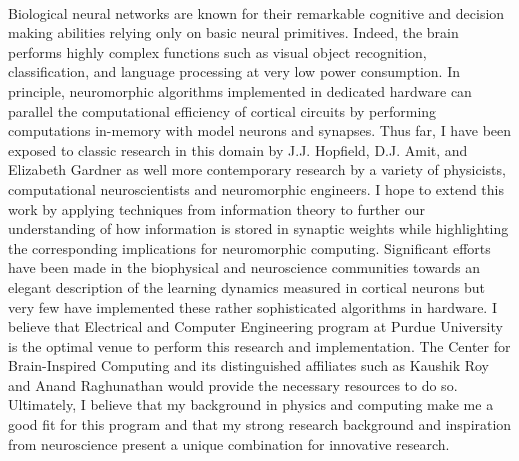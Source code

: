 \documentclass{article}
\begin{document}
\\
\indent Biological neural networks are known for their remarkable cognitive and decision making abilities relying only on basic neural primitives. Indeed, the brain performs highly complex functions such as visual object recognition, classification, and language processing at very low power consumption. In principle, neuromorphic algorithms implemented in dedicated hardware can parallel the computational efficiency of cortical circuits by performing computations in-memory with model neurons and synapses. Thus far, I have been exposed to classic research in this domain by J.J. Hopfield, D.J. Amit, and Elizabeth Gardner as well more contemporary research by a variety of physicists, computational neuroscientists and neuromorphic engineers. I hope to extend this work by applying techniques from information theory to further our understanding of how information is stored in synaptic weights while highlighting the corresponding implications for neuromorphic computing. Significant efforts have been made in the biophysical and neuroscience communities towards an elegant description of the learning dynamics measured in cortical neurons but very few have implemented these rather sophisticated algorithms in hardware. I believe that Electrical and Computer Engineering program at Purdue University is the optimal venue to perform this research and implementation. The Center for Brain-Inspired Computing and its distinguished affiliates such as Kaushik Roy and Anand Raghunathan would provide the necessary resources to do so. Ultimately, I believe that my background in physics and computing make me a good fit for this program and that my strong research background and inspiration from neuroscience present a unique combination for innovative research.\\
\end{document}
